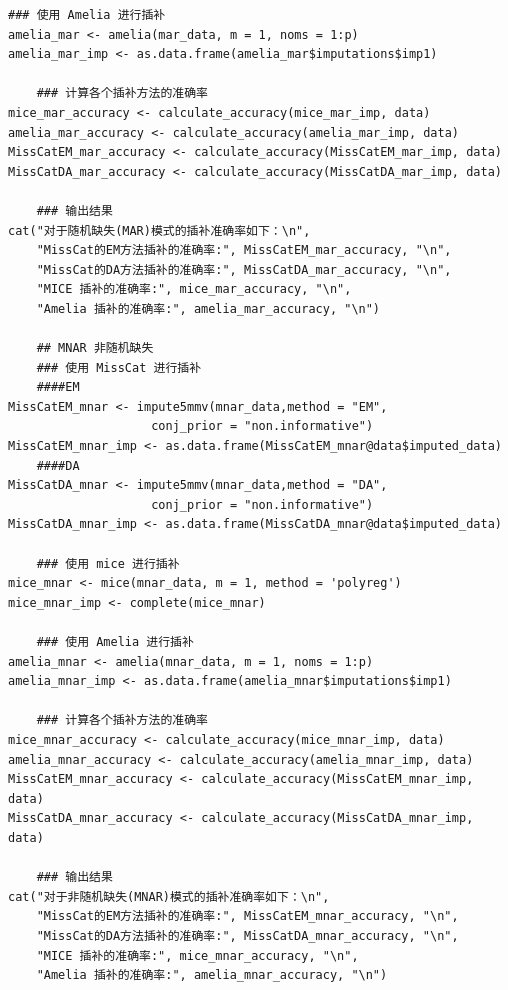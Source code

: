 \documentclass[12pt,hyperref,a4paper,UTF8]{ctexart}
\begin{document}
\begin{lstlisting}[style=R, title=testMissCat.R]
    ### 使用 Amelia 进行插补
amelia_mar <- amelia(mar_data, m = 1, noms = 1:p)
amelia_mar_imp <- as.data.frame(amelia_mar$imputations$imp1)
    
    ### 计算各个插补方法的准确率
mice_mar_accuracy <- calculate_accuracy(mice_mar_imp, data)
amelia_mar_accuracy <- calculate_accuracy(amelia_mar_imp, data)
MissCatEM_mar_accuracy <- calculate_accuracy(MissCatEM_mar_imp, data)
MissCatDA_mar_accuracy <- calculate_accuracy(MissCatDA_mar_imp, data)
    
    ### 输出结果
cat("对于随机缺失(MAR)模式的插补准确率如下：\n",
    "MissCat的EM方法插补的准确率:", MissCatEM_mar_accuracy, "\n",
    "MissCat的DA方法插补的准确率:", MissCatDA_mar_accuracy, "\n",
    "MICE 插补的准确率:", mice_mar_accuracy, "\n",
    "Amelia 插补的准确率:", amelia_mar_accuracy, "\n")
    
    ## MNAR 非随机缺失
    ### 使用 MissCat 进行插补
    ####EM
MissCatEM_mnar <- impute5mmv(mnar_data,method = "EM",
                    conj_prior = "non.informative")
MissCatEM_mnar_imp <- as.data.frame(MissCatEM_mnar@data$imputed_data)
    ####DA
MissCatDA_mnar <- impute5mmv(mnar_data,method = "DA",
                    conj_prior = "non.informative")
MissCatDA_mnar_imp <- as.data.frame(MissCatDA_mnar@data$imputed_data)
    
    ### 使用 mice 进行插补
mice_mnar <- mice(mnar_data, m = 1, method = 'polyreg')
mice_mnar_imp <- complete(mice_mnar)
    
    ### 使用 Amelia 进行插补
amelia_mnar <- amelia(mnar_data, m = 1, noms = 1:p)
amelia_mnar_imp <- as.data.frame(amelia_mnar$imputations$imp1)
    
    ### 计算各个插补方法的准确率
mice_mnar_accuracy <- calculate_accuracy(mice_mnar_imp, data)
amelia_mnar_accuracy <- calculate_accuracy(amelia_mnar_imp, data)
MissCatEM_mnar_accuracy <- calculate_accuracy(MissCatEM_mnar_imp, data)
MissCatDA_mnar_accuracy <- calculate_accuracy(MissCatDA_mnar_imp, data)
    
    ### 输出结果
cat("对于非随机缺失(MNAR)模式的插补准确率如下：\n",
    "MissCat的EM方法插补的准确率:", MissCatEM_mnar_accuracy, "\n",
    "MissCat的DA方法插补的准确率:", MissCatDA_mnar_accuracy, "\n",
    "MICE 插补的准确率:", mice_mnar_accuracy, "\n",
    "Amelia 插补的准确率:", amelia_mnar_accuracy, "\n")
\end{lstlisting}
\end{document}
